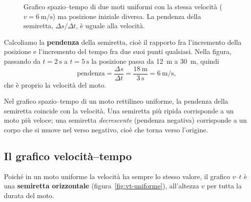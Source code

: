 \begin{figure}[!htbp]
    \centering
    \caption{Grafico spazio--tempo di due moti uniformi con la stessa velocità ($v = \SI{6}{\metre\per\second}$) ma posizione iniziale diversa. La pendenza della semiretta, $\Delta s / \Delta t$, è uguale alla velocità.}
    \label{fig:st-uniforme}
\end{figure}

Calcoliamo la \textbf{pendenza} della semiretta, cioè il rapporto fra l'incremento della posizione e l'incremento del tempo fra due suoi punti qualsiasi. Nella figura, passando da $t = \SI{2}{\second}$ a $t = \SI{5}{\second}$ la posizione passa da \SI{12}{\metre} a \SI{30}{\metre}, quindi
\[ \text{pendenza} = \frac{\Delta s}{\Delta t} = \frac{\SI{18}{\metre}}{\SI{3}{\second}} = \SI{6}{\metre\per\second}, \]
che è proprio la velocità del moto.

\begin{remark}
Nel grafico spazio--tempo di un moto rettilineo uniforme, la pendenza della semiretta coincide con la velocità. Una semiretta più ripida corrisponde a un moto più veloce; una semiretta \emph{decrescente} (pendenza negativa) corrisponde a un corpo che si muove nel verso negativo, cioè che torna verso l'origine.
\end{remark}

\subsection{Il grafico velocità--tempo}
Poiché in un moto uniforme la velocità ha sempre lo stesso valore, il grafico $v$--$t$ è una \textbf{semiretta orizzontale} (figura~\ref{fig:vt-uniforme}), all'altezza $v$ per tutta la durata del moto.

